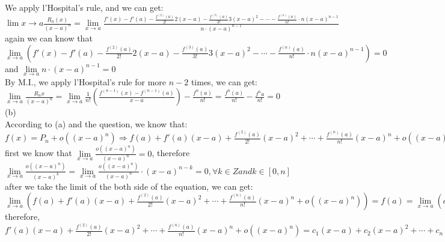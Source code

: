 \documentclass{article}
\begin{document}
We apply l'Hospital's rule, and we can get:\\

$\lim \limits{x \to a}\frac{R_n(x)}{(x-a)^n}=\lim \limits_{x \to a}\displaystyle\frac{f'(x)-f'(a)-\frac{f^{(2)}(a)}{2!}2(x-a)-\frac{f^{(3)}(a)}{3!}3(x-a)^2-\cdots-\frac{f^{(n)}(a)}{n!}\cdot n(x-a)^{n-1}}{n\cdot(x-a)^{n-1}}$\\

again we can know that $\lim \limits_{x \to a}\left(f'(x)-f'(a)-\frac{f^{(2)}(a)}{2!}2(x-a)-\frac{f^{(3)}(a)}{3!}3(x-a)^2-\cdots-\frac{f^{(n)}(a)}{n!}\cdot n(x-a)^{n-1}\right)=0$ and $\lim \limits_{x \to a}n\cdot(x-a)^{n-1}=0$\\

By M.I., we apply l'Hospital's rule for more $n-2$ times, we can get:\\

$\lim \limits_{x \to a}\displaystyle\frac{R_n{x}}{(x-a)^n}=\lim \limits_{x \to a}\frac{1}{n!}\left(\frac{f^{(n-1)}(x)-f^{(n-1)}(a)}{x-a}\right)-\frac{f^n(a)}{n!}=\frac{f^n(a)}{n!}-\frac{f^n{a}}{n!}=0$\\

(b)\\

According to (a) and the question, we know that:\\

$f(x)=P_n+o\left((x-a)^n\right)\Rightarrow f(a)+f'(a)(x-a)+\displaystyle\frac{f^{(2)}(a)}{2!}(x-a)^2+\cdots+\frac{f^{(n)}(a)}{n!}(x-a)^n+o\left((x-a)^n\right)=c_0+c_1(x-a)+c_2(x-a)^2+\cdots+c_n(x-a)^n+\left((x-a)^n\right)$\\

first we know that $\lim \limits_{x \to a}\displaystyle\frac{o\left((x-a)^n\right)}{(x-a)^n}=0$, therefore $\lim \limits_{x \to a}\displaystyle\frac{o\left((x-a)^n\right)}{(x-a)^k}=\lim \limits_{x \to a}\frac{o\left((x-a)^n\right)}{(x-a)^n}\cdot(x-a)^{n-k}=0, \forall k\in Z and k\in [0,n]$\\

after we take the limit of the both side of the equation, we can get:\\

$\lim \limits_{x \to a}\left(f(a)+f'(a)(x-a)+\displaystyle\frac{f^{(2)}(a)}{2!}(x-a)^2+\cdots+\frac{f^{(n)}(a)}{n!}(x-a)^n+o\left((x-a)^n\right)\right)=f(a)=\lim \limits_{x \to a}\left(c_0+c_1(x-a)+c_2(x-a)^2+\cdots+c_n(x-a)^n+\left((x-a)^n\right)\right)=c_0$\\

therefore, $f'(a)(x-a)+\displaystyle\frac{f^{(2)}(a)}{2!}(x-a)^2+\cdots+\frac{f^{(n)}(a)}{n!}(x-a)^n+o\left((x-a)^n\right)=c_1(x-a)+c_2(x-a)^2+\cdots+c_n(x-a)^n+\left((x-a)^n\right)$\\
\end{document}
